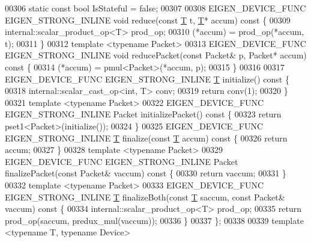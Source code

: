 \begin{DoxyCode}
00306   \textcolor{keyword}{static} \textcolor{keyword}{const} \textcolor{keywordtype}{bool} IsStateful = \textcolor{keyword}{false};
00307 
00308   EIGEN\_DEVICE\_FUNC EIGEN\_STRONG\_INLINE \textcolor{keywordtype}{void} reduce(\textcolor{keyword}{const} \hyperlink{group___sparse_core___module_class_eigen_1_1_triplet}{T} t, \hyperlink{group___sparse_core___module_class_eigen_1_1_triplet}{T}* accum)\textcolor{keyword}{ const }\{
00309     internal::scalar\_product\_op<T> prod\_op;
00310     (*accum) = prod\_op(*accum, t);
00311   \}
00312   \textcolor{keyword}{template} <\textcolor{keyword}{typename} Packet>
00313   EIGEN\_DEVICE\_FUNC EIGEN\_STRONG\_INLINE \textcolor{keywordtype}{void} reducePacket(\textcolor{keyword}{const} Packet& p, Packet* accum)\textcolor{keyword}{ const }\{
00314     (*accum) = pmul<Packet>(*accum, p);
00315   \}
00316 
00317   EIGEN\_DEVICE\_FUNC EIGEN\_STRONG\_INLINE \hyperlink{group___sparse_core___module_class_eigen_1_1_triplet}{T} initialize()\textcolor{keyword}{ const }\{
00318     internal::scalar\_cast\_op<int, T> conv;
00319     \textcolor{keywordflow}{return} conv(1);
00320   \}
00321   \textcolor{keyword}{template} <\textcolor{keyword}{typename} Packet>
00322   EIGEN\_DEVICE\_FUNC EIGEN\_STRONG\_INLINE Packet initializePacket()\textcolor{keyword}{ const }\{
00323     \textcolor{keywordflow}{return} pset1<Packet>(initialize());
00324   \}
00325   EIGEN\_DEVICE\_FUNC EIGEN\_STRONG\_INLINE \hyperlink{group___sparse_core___module_class_eigen_1_1_triplet}{T} finalize(\textcolor{keyword}{const} \hyperlink{group___sparse_core___module_class_eigen_1_1_triplet}{T} accum)\textcolor{keyword}{ const }\{
00326     \textcolor{keywordflow}{return} accum;
00327   \}
00328   \textcolor{keyword}{template} <\textcolor{keyword}{typename} Packet>
00329   EIGEN\_DEVICE\_FUNC EIGEN\_STRONG\_INLINE Packet finalizePacket(\textcolor{keyword}{const} Packet& vaccum)\textcolor{keyword}{ const }\{
00330     \textcolor{keywordflow}{return} vaccum;
00331   \}
00332   \textcolor{keyword}{template} <\textcolor{keyword}{typename} Packet>
00333   EIGEN\_DEVICE\_FUNC EIGEN\_STRONG\_INLINE \hyperlink{group___sparse_core___module_class_eigen_1_1_triplet}{T} finalizeBoth(\textcolor{keyword}{const} \hyperlink{group___sparse_core___module_class_eigen_1_1_triplet}{T} saccum, \textcolor{keyword}{const} Packet& vaccum)\textcolor{keyword}{ const }\{
00334     internal::scalar\_product\_op<T> prod\_op;
00335     \textcolor{keywordflow}{return} prod\_op(saccum, predux\_mul(vaccum));
00336   \}
00337 \};
00338 
00339 \textcolor{keyword}{template} <\textcolor{keyword}{typename} T, \textcolor{keyword}{typename} Device>

\end{DoxyCode}
